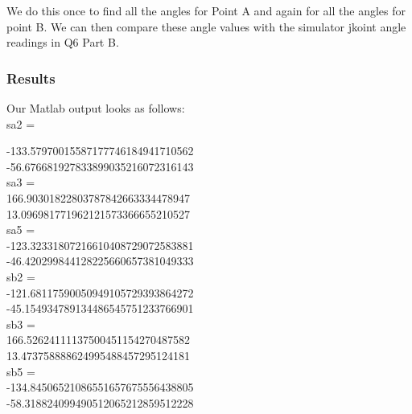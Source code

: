 	We do this once to find all the angles for Point A and again for all the angles for point B. We can then compare these angle values with the simulator jkoint angle readings in Q6 Part B.
	
		\subsubsection{Results}
		Our Matlab output looks as follows:\\
	sa2 =
	
\hspace{20mm}	-133.57970015587177746184941710562\\
\hspace{20mm}	-56.676681927833899035216072316143\\
	
	
	sa3 =\\
	
\hspace{20mm}	166.90301822803787842663334478947\\
\hspace{20mm}	13.096981771962121573366655210527\\
	
	
	sa5 =\\
	
\hspace{20mm}	-123.32331807216610408729072583881\\
\hspace{20mm}	-46.420299844128225660657381049333\\
	
	
	sb2 =\\
	
\hspace{20mm}	-121.68117590050949105729393864272\\
\hspace{20mm}	-45.154934789134486545751233766901\\
	
	
	sb3 =\\
	
\hspace{20mm}	166.52624111137500451154270487582\\
\hspace{20mm}	13.473758888624995488457295124181\\
	
	
	sb5 =\\
	
\hspace{20mm}	-134.84506521086551657675556438805\\
\hspace{20mm}	-58.318824099490512065212859512228\\
	
